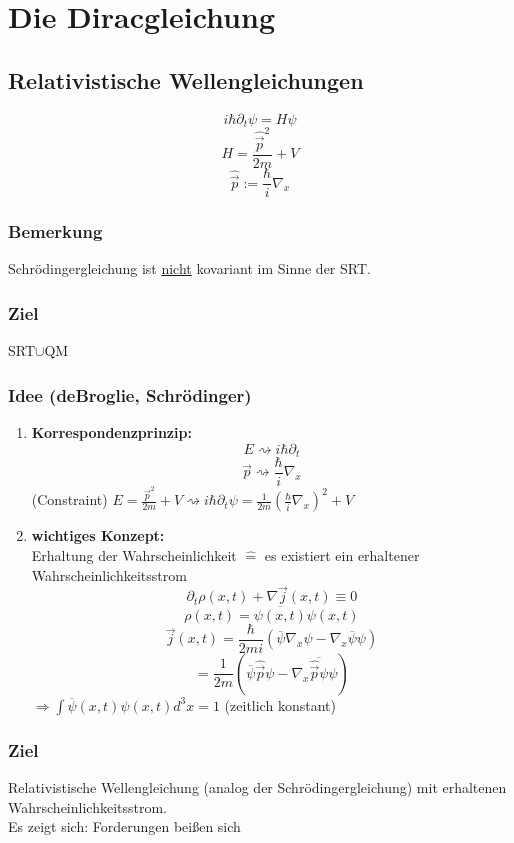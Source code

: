 \documentclass[twoside,a4paper]{scrartcl}
\renewcommand{\1}{\mathds{1}}
\newcommand{\Ra}{\Rightarrow}
\newcommand{\entspricht}{\mathrel{\widehat{=}}}
\begin{document}
\section{Die Diracgleichung}
\subsection{Relativistische Wellengleichungen}

$$i\hbar \partial_t \psi=H\psi$$
$$H=\frac{\hat{\vec p}^2}{2m}+V$$
$$\hat{\vec p}:=\frac{\hbar}{i}\nabla_x$$

\subsubsection*{Bemerkung}

Schrödingergleichung ist \underline{nicht} kovariant im Sinne der SRT.

\subsubsection*{Ziel}

SRT$\cup$QM

\subsubsection*{Idee (deBroglie, Schrödinger)}

\begin{enumerate}
\item \textbf{Korrespondenzprinzip:}
$$E \rightsquigarrow i\hbar \partial_t$$
$$\vec p \rightsquigarrow \frac{\hbar}{i} \nabla_x$$
(Constraint) $E=\frac{\vec p^2}{2m}+V \rightsquigarrow  i\hbar \partial_t \psi=\frac{1}{2m}(\frac{\hbar}{i}\nabla_x)^2+V$
\item \textbf{wichtiges Konzept:}\\
Erhaltung der Wahrscheinlichkeit $\entspricht$ es existiert ein erhaltener Wahrscheinlichkeitsstrom
$$\partial_t \rho(x,t)+\nabla \vec j(x,t)\equiv0$$
$$\rho(x,t)=\overline{\psi(x,t)} \psi(x,t)$$
$$\vec j(x,t)=\frac{\hbar}{2mi}(\overline{\psi}\nabla_x \psi-\nabla_x \overline{\psi}\psi)$$
$$=\frac{1}{2m}(\overline{\psi} \hat{\vec p} \psi-\nabla_x \overline{\hat{\vec p}\psi}\psi)$$
$\Ra \int \overline{\psi}(x,t) \psi(x,t)d^3x=1$ (zeitlich konstant) 
\end{enumerate}
\subsubsection*{Ziel}
Relativistische Wellengleichung (analog der Schrödingergleichung) mit erhaltenen Wahrscheinlichkeitsstrom.\\
Es zeigt sich: Forderungen beißen sich
\end{document}
